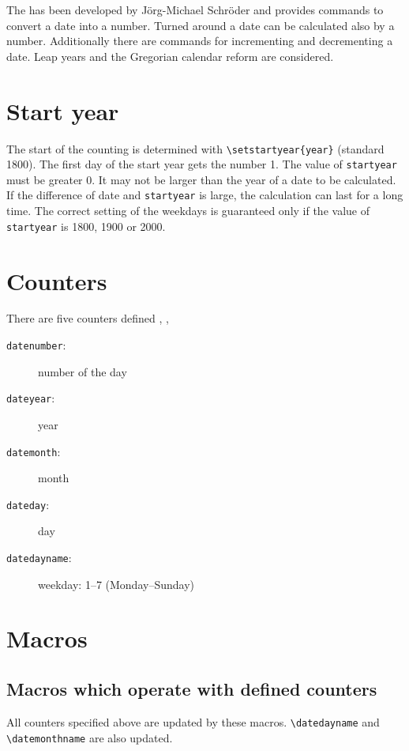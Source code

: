 \makeatother








The  has been developed by J\"org-Michael Schr\"oder and provides commands to convert a date into a number. Turned around a date can be calculated also by a number. Additionally there are commands for incrementing and decrementing a date. Leap years and the Gregorian calendar reform are considered.

\section{Start year}

The start of the counting is determined with \verb+\setstartyear{year}+ (standard 1800). The first day of the start year gets the number 1. The value of \texttt{startyear} must be greater 0. It may not be larger than the year of a date to be calculated. If the difference of date and \texttt{startyear} is large, the calculation can last for a long time. The correct setting of the weekdays is guaranteed only if the value of \texttt{startyear} is 1800, 1900 or 2000.


\section{Counters}
There are five counters defined , , 

\begin{description}
\item[\texttt{datenumber}:] number of the day
\item[\texttt{dateyear}:] year
\item[\texttt{datemonth}:] month
\item[\texttt{dateday}:] day
\item[\texttt{datedayname}:] weekday: 1--7 (Monday--Sunday)
\end{description}


\section{Macros}
\subsection{Macros which operate with defined counters\label{macro}}
All counters specified above are updated by these macros. \verb+\datedayname+ and \verb+\datemonthname+ are also updated.

